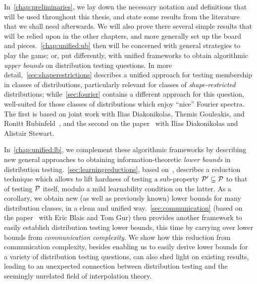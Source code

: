 In~\cref{chap:preliminaries}, we lay down the necessary notation and definitions that will be used throughout this thesis, and state some results from the literature that we shall need afterwards. We will also prove there several simple results that will be relied upon in the other chapters, and more generally set up the board and pieces.~\cref{chap:unified:ub} then will be concerned with general strategies to play the game; or, put differently, with unified frameworks to obtain algorithmic \emph{upper bounds} on distribution testing questions. In more detail,~\cref{sec:shaperestrictions} describes a unified approach for testing membership in classes of distributions, particularly relevant for classes of \emph{shape-restricted} distributions; while~\cref{sec:fourier} contains a different approach for this question, well-suited for those classes of distributions which enjoy ``nice'' Fourier spectra. The first is based on joint work with Ilias Diakonikolas, Themis Gouleakis, and Ronitt Rubinfeld~\cite{CDGR:16}, and the second on the paper~\cite{CanonneDS:17} with Ilias Diakonikolas and Alistair Stewart.

In~\cref{chap:unified:lb}, we complement these algorithmic frameworks by describing new general approaches to obtaining information-theoretic \emph{lower bounds} in distribution testing.~\cref{sec:learningreductions}, based on~\cite{CDGR:16}, describes a reduction technique which allows to lift hardness of testing a sub-property $\mathcal{P}'\subseteq\mathcal{P}$ to that of testing $\mathcal{P}$ itself, modulo a mild learnability condition on the latter. As a corollary, we obtain new (as well as previously known) lower bounds for many distribution classes, in a clean and unified way.~\cref{sec:communication} (based on the paper~\cite{BCG:17} with Eric Blais and Tom Gur) then provides another framework  to easily establish distribution testing lower bounds, this time by carrying over lower bounds from \emph{communication complexity}. We show how this reduction from communication complexity, besides enabling us to easily derive lower bounds for a variety of distribution testing questions, can also shed light on existing results, leading to an unexpected connection between distribution testing and the seemingly unrelated field of interpolation theory.

